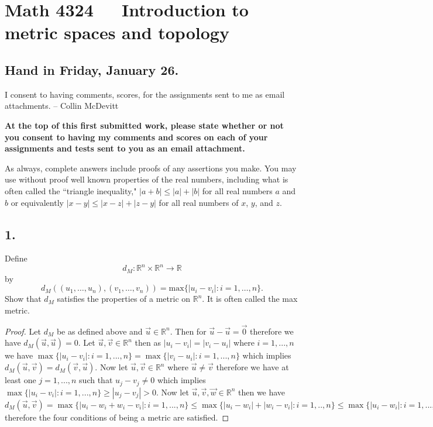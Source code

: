 \documentclass{amsart}
\theoremstyle{plain}
\theoremstyle{definition}
\theoremstyle{remark}
\begin{document}
\section*{Math 4324\ \ \  Introduction to metric spaces and topology }

\subsection*{Hand in Friday, January 26.}
I consent to having comments, scores, for the assignments sent to me as email attachments. -- Collin McDevitt

\vspace{.15in}
{\bf At the top of this first submitted work, please state whether or not you consent to having my comments and scores on each of your assignments and tests sent to you as an email attachment.}

\vspace{.15in}
As always, complete answers include proofs of any assertions you make. You may use without proof well known properties of the real numbers, including what is often called the ``triangle inequality," $|a+b| \le |a| + |b|$ for all real numbers $a$ and $b$ or equivalently $|x-y| \le |x-z| + |z-y|$ for all real numbers of $x$, $y$, and $z$.

\vspace{.15in}


\noindent
\subsection*{1.}  Define
\[
    d_M : \mathbb R ^n \times \mathbb R ^n \rightarrow \mathbb R
\]
by
\[
    d_M ( (u_1, \ldots , u_n) , (v_1, \ldots , v_n )) =\mbox{max} \{|u_i - v_i| : i = 1, \ldots , n \} .
\]
Show that $d_M$ satisfies the properties of a metric on $\mathbb R ^ n$. It is often called the max metric.
\vspace{.15in}

\begin{proof}
    Let $d_M$ be as defined above and $\vec{u}\in \mathbb{R}^n$. Then for $\vec{u}-\vec{u}=\vec{0}$ therefore we have $d_M(\vec{u},\vec{u})=0$. Let $\vec{u},\vec{v}\in \mathbb{R}^n$ then as $|u_i-v_i|=|v_i-u_i|$ where $i=1,...,n$ we have $\max\{|u_i-v_i|:i=1,...,n\}=\max\{|v_i-u_i|:i=1,...,n\}$ which implies $d_M(\vec{u},\vec{v})=d_M(\vec{v},\vec{u})$. Now let $\vec{u},\vec{v}\in \mathbb{R}^n$ where $\vec{u}\not = \vec{v}$ therefore we have at least one $j=1,...,n$ such that $u_j-v_j\not = 0$ which implies $\max\{|u_i-v_i|:i=1,...,n\}\geq |u_j-v_j|>0$. Now let $\vec{u},\vec{v},\vec{w}\in \mathbb{R}^n$ then we have $d_M(\vec{u},\vec{v})=\max\{|u_i-w_i+w_i-v_i|:i=1,...,n\}\leq \max\{|u_i-w_i|+|w_i-v_i|:i=1,..,n\}\leq \max\{|u_i-w_i|:i=1,...,n\}+\max\{|w_i-v_i|:i=1,...,n\}=d_M(\vec{u},\vec{w})+d_M(\vec{w},\vec{v})$ therefore the four conditions of being a metric are satisfied.
\end{proof}
\end{document}

